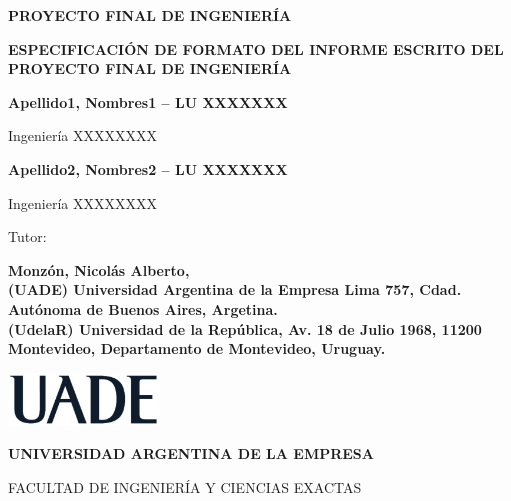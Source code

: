 \begin{titlepage}
    \centering

    {\textbf{\fontsize{18}{20}\selectfont PROYECTO FINAL DE INGENIERÍA} \par}
    \vspace{1.5cm}

    {\textbf{\fontsize{16}{18}\selectfont ESPECIFICACIÓN DE FORMATO DEL INFORME ESCRITO DEL PROYECTO FINAL DE INGENIERÍA} \par}
    \vspace{0.5cm}

    {\textbf{\fontsize{14}{16}\selectfont Apellido1, Nombres1 -- LU XXXXXXX} \par}
    {\fontsize{14}{16}\selectfont Ingeniería XXXXXXXX \par}
    \vspace{1cm}

    {\textbf{\fontsize{14}{16}\selectfont Apellido2, Nombres2 -- LU XXXXXXX} \par}
    {\fontsize{14}{16}\selectfont Ingeniería XXXXXXXX \par}
    \vspace{1.5cm}

    {\fontsize{14}{16}\selectfont Tutor: \par}
    {\textbf{\fontsize{14}{16}\selectfont Monzón, Nicolás Alberto,
		\\ (UADE) Universidad Argentina de la Empresa Lima 757, Cdad. Autónoma de Buenos Aires, Argetina.
		\\ (UdelaR) Universidad de la República, Av. 18 de Julio 1968, 11200 Montevideo, Departamento de Montevideo, Uruguay.
			} \par}
    \vspace{3cm}

	{\textbf{\fontsize{14}{16}\selectfont \the\year} \par}
    \vspace{2cm}

    \includegraphics[width=0.30\textwidth]{./images/UADE}\par \vspace{1cm}
    {\textbf{\fontsize{14}{16}\selectfont UNIVERSIDAD ARGENTINA DE LA EMPRESA} \par}
    {\fontsize{14}{16}\selectfont FACULTAD DE INGENIERÍA Y CIENCIAS EXACTAS \par}
\end{titlepage}